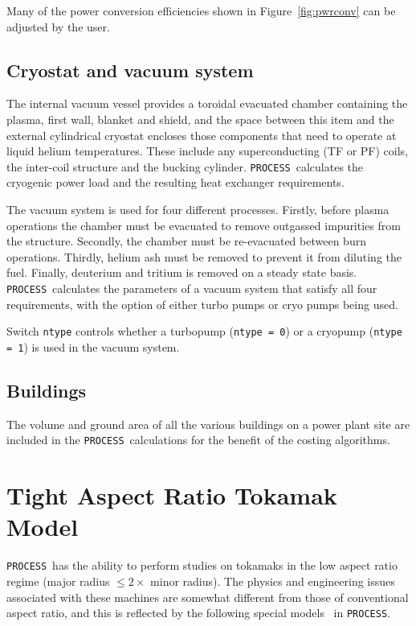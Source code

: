 \documentclass[11pt,a4paper]{report}
\newcommand{\process}{\mbox{\texttt{PROCESS}}}
\begin{document}
Many of the power conversion efficiencies shown in Figure~\ref{fig:pwrconv}
can be adjusted by the user.

\subsection{Cryostat and vacuum system}

The internal vacuum vessel provides a toroidal evacuated chamber containing the
plasma, first wall, blanket and shield, and the space between this item and
the external cylindrical cryostat encloses those components that need to
operate at liquid helium temperatures. These include any superconducting (TF
or PF) coils, the inter-coil structure and the bucking cylinder. \process\
calculates the cryogenic power load and the resulting heat exchanger
requirements.

The vacuum system is used for four different processes. Firstly, before plasma
operations the chamber must be evacuated to remove outgassed impurities from
the structure. Secondly, the chamber must be re-evacuated between burn
operations. Thirdly, helium ash must be removed to prevent it from diluting
the fuel. Finally, deuterium and tritium is removed on a steady state
basis. \process\ calculates the parameters of a vacuum system that satisfy
all four requirements, with the option of either turbo pumps or cryo pumps
being used.

Switch \texttt{ntype} controls whether a turbopump (\texttt{ntype = 0}) or a
cryopump (\texttt{ntype = 1}) is used in the vacuum system.

\subsection{Buildings}

The volume and ground area of all the various buildings on a power plant site
are included in the \process\ calculations for the benefit of the costing
algorithms. %

\section{Tight Aspect Ratio Tokamak Model}
\label{sec:tart}

\process\ has the ability to perform studies on tokamaks in the low aspect ratio
regime (major radius $\leq 2 \times$ minor radius). The physics and
engineering issues~\cite{tart} associated with these machines are somewhat
different from those of conventional aspect ratio, and this is reflected by
the following special models~\cite{storac} in \process.
\end{document}
